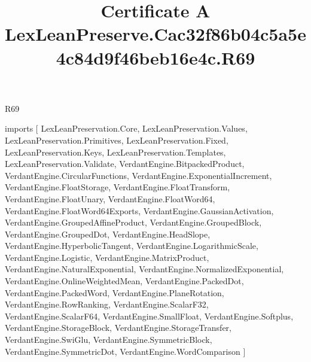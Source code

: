 \begin{lexlean}{R69}
\title{Certificate A LexLeanPreserve.Cac32f86b04c5a5e4c84d9f46beb16e4c.R69}
\begin{coremodule}
imports [
  LexLeanPreservation.Core,
  LexLeanPreservation.Values,
  LexLeanPreservation.Primitives,
  LexLeanPreservation.Fixed,
  LexLeanPreservation.Keys,
  LexLeanPreservation.Templates,
  LexLeanPreservation.Validate,
  VerdantEngine.BitpackedProduct,
  VerdantEngine.CircularFunctions,
  VerdantEngine.ExponentialIncrement,
  VerdantEngine.FloatStorage,
  VerdantEngine.FloatTransform,
  VerdantEngine.FloatUnary,
  VerdantEngine.FloatWord64,
  VerdantEngine.FloatWord64Exports,
  VerdantEngine.GaussianActivation,
  VerdantEngine.GroupedAffineProduct,
  VerdantEngine.GroupedBlock,
  VerdantEngine.GroupedDot,
  VerdantEngine.HeadSlope,
  VerdantEngine.HyperbolicTangent,
  VerdantEngine.LogarithmicScale,
  VerdantEngine.Logistic,
  VerdantEngine.MatrixProduct,
  VerdantEngine.NaturalExponential,
  VerdantEngine.NormalizedExponential,
  VerdantEngine.OnlineWeightedMean,
  VerdantEngine.PackedDot,
  VerdantEngine.PackedWord,
  VerdantEngine.PlaneRotation,
  VerdantEngine.RowRanking,
  VerdantEngine.ScalarF32,
  VerdantEngine.ScalarF64,
  VerdantEngine.SmallFloat,
  VerdantEngine.Softplus,
  VerdantEngine.StorageBlock,
  VerdantEngine.StorageTransfer,
  VerdantEngine.SwiGlu,
  VerdantEngine.SymmetricBlock,
  VerdantEngine.SymmetricDot,
  VerdantEngine.WordComparison
]


\end{coremodule}
\end{lexlean}
